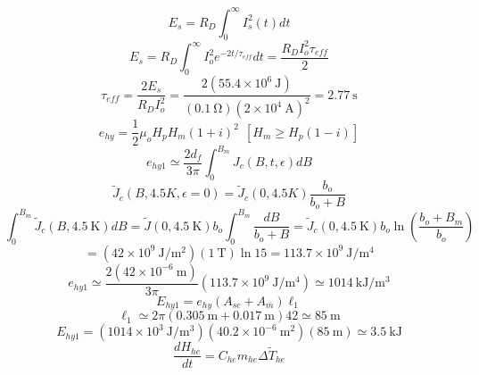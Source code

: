 \begin{equation}%
E_s=R_D\int_{0}^{\infty}I_s^2(t)dt
\end{equation}
\begin{equation}%
E_s=R_D\int_{0}^{\infty}I_{o}^2e^{-2t/\tau_{eff}}dt=\frac{R_DI_o^2\tau_{eff}}{2}
\end{equation}
\begin{equation}%
\tau_{eff}=\frac{2E_s}{R_DI_o^2}=\frac{2(55.4\times10^6\ \mathrm{J})}{(0.1\ \mathrm{\Omega})(2\times10^4\ \mathrm{A})^2}=2.77\ \mathrm{s}
\end{equation}
\begin{equation}%
e_{hy}=\frac{1}{2}\mu_oH_pH_m(1+i)^2\     \ [H_m\geq H_p(1-i)]
\end{equation}
\begin{equation}%
e_{hy1}\simeq\frac{2d_f}{3\pi}\int_{0}^{B_m}J_c(B,t,\epsilon)dB
\end{equation}
\begin{equation}%
\tilde{J}_c(B,4.5K,\epsilon=0)=\tilde{J}_c(0,4.5K)\frac{b_o}{b_o+B}
\end{equation}
\begin{equation}%
\int_{0}^{B_m}\tilde{J}_c(B,4.5\ \mathrm{K})dB=\tilde{J}(0,4.5\ \mathrm{K})b_o\int_{0}^{B_m}\frac{dB}{b_o+B}=\tilde{J}_c(0,4.5\ \mathrm{K})b_o\ln(\frac{b_o+B_m}{b_o})
\end{equation}
\begin{equation}%
=(42\times10^9\ \mathrm{J/m^2})(1\ \mathrm{T})\ln15=113.7\times10^9\ \mathrm{J/m^4}
\end{equation}
\begin{equation}%
e_{hy1}\simeq\frac{2(42\times10^{-6}\ \mathrm{m})}{3\pi}(113.7\times10^9\ \mathrm{J/m^4})\simeq1014\ \mathrm{kJ/m^3}
\end{equation}
\begin{equation}%
E_{hy1}=e_{hy}(A_{sc}+A_{\bar{m}})\ell_1
\end{equation}
\begin{equation}%
\ell_1\simeq2\pi(0.305\ \mathrm{m}+0.017\ \mathrm{m})42\simeq85\ \mathrm{m}
\end{equation}
\begin{equation}%
E_{hy1}=(1014\times10^3\ \mathrm{J/m^3})(40.2\times10^{-6}\ \mathrm{m^2})(85\ \mathrm{m})\simeq 3.5\ \mathrm{kJ}
\end{equation}
\begin{equation}%
\frac{dH_{he}}{dt}=C_{he}m_{he}\Delta\tilde{T}_{he}
\end{equation}

